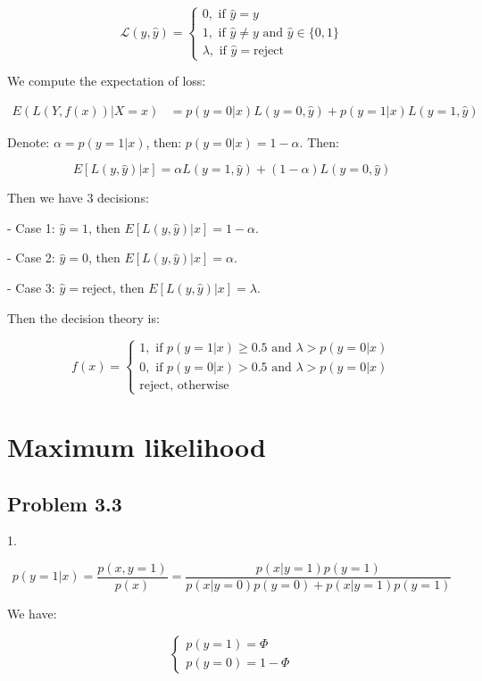 \documentclass{article}
\begin{document}
$$
\mathcal{L}(y,\hat{y}) =
\begin{cases}
    0, \text{ if }\hat{y} = y\\
    1, \text{ if }\hat{y}\neq y \text{ and }\hat{y}\in\{0,1\}\\
    \lambda, \text{ if }\hat{y}=\text{reject}
\end{cases}
$$

We compute the expectation of loss:

$$
\begin{aligned}
    E(L(Y,f(x))|X=x) &= p(y=0|x)L(y=0,\hat{y})+p(y=1|x)L(y=1,\hat{y})
\end{aligned}
$$

Denote: $\alpha = p(y=1|x)$, then: $p(y=0|x)=1-\alpha$. Then:

$$
E[L(y,\hat{y})|x]=\alpha L(y=1,\hat{y})+(1-\alpha)L(y=0,\hat{y})
$$

Then we have 3 decisions:

- Case 1: $\hat{y}=1$, then $E[L(y,\hat{y})|x]=1-\alpha$.

- Case 2: $\hat{y}=0$, then $E[L(y,\hat{y})|x]=\alpha$.

- Case 3: $\hat{y}=$reject, then $E[L(y,\hat{y})|x]=\lambda$.

Then the decision theory is:

$$
f(x)=
\begin{cases}
    1, \text{ if }p(y=1|x)\geq 0.5 \text{ and }\lambda>p(y=0|x)\\
    0, \text{ if }p(y=0|x)>0.5 \text{ and }\lambda>p(y=0|x)\\
    \text{reject, otherwise}
\end{cases}
$$

\section{Maximum likelihood}

\subsection{Problem 3.3}

1.

\begin{equation}\label{eq3}
    p(y=1|x) = \frac{p(x,y=1)}{p(x)}=\frac{p(x|y=1)p(y=1)}{p(x|y=0)p(y=0)+p(x|y=1)p(y=1)}
\end{equation}

We have:

\begin{equation}\label{eq4}
    \begin{cases}
        p(y=1) = \Phi \\
        p(y=0) = 1-\Phi
    \end{cases}
\end{equation}
\end{document}
